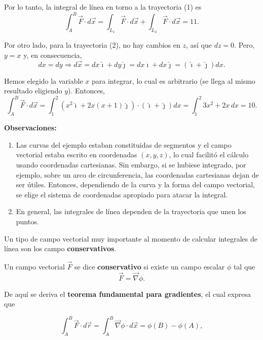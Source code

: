 \begin{ejemplo}
    Por lo tanto, la integral de línea en torno a la trayectoria (1) es
    $$\int_A^B \Vec{F} \cdot d\Vec{x} = \int_{L_1} \Vec{F} \cdot d \Vec{x} + \int_{L_2} \Vec{F} \cdot d \Vec{x} = 11.$$

    Por otro lado, para la trayectoria (2), no hay cambios en $z$, así que $dz = 0$. Pero, $y = x$ y, en consecuencia,
    $$dx = dy \Rightarrow d\Vec{x} = dx \hat{\imath} + dy \hat{\jmath} = dx \hat{\imath} + dx \hat{\jmath} = (\hat{\imath} + \hat{\jmath} ) dx.$$

    Hemos elegido la variable $x$ para integrar, lo cual es arbitrario (se llega al mismo resultado eligiendo $y$). Entonces,
    $$\int_A^B \Vec{F} \cdot d\Vec{x} = \int_1^2 (x^2 \hat{\imath} + 2x(x+1) \hat{\jmath}) \cdot (\hat{\imath} + \hat{\jmath} ) dx = \int_1^2 3x^2 + 2x \,dx = 10.$$
\end{ejemplo}

\textbf{Observaciones:}

\begin{enumerate}
    \item Las curvas del ejemplo estaban constituidas de segmentos y el campo vectorial estaba escrito en coordenadas $(x,y,z)$, lo cual facilitó el cálculo usando coordenadas cartesianas. Sin embargo, si se hubiese integrado, por ejemplo, sobre un arco de circunferencia, las coordenadas cartesianas dejan de ser útiles. Entonces, dependiendo de la curva y la forma del campo vectorial, se elige el sistema de coordenadas apropiado para atacar la integral.

    \item En general, las integrales de línea dependen de la trayectoria que unen los puntos.
\end{enumerate}


Un tipo de campo vectorial muy importante al momento de calcular integrales de línea son los campo \textbf{conservativos}. 

Un campo vectorial $\vec{F}$ se dice \textbf{conservativo} si existe un campo escalar $\phi$ tal que
\begin{equation*}
\vec{F} = \vec{\nabla} \phi.
\end{equation*}

De aquí se deriva el \textbf{teorema fundamental para gradientes}, el cual expresa que
\begin{shaded}
   \begin{equation*}
\int_A^B \vec{F} \cdot d\vec{r} = \int_A^B \Vec{\nabla} \phi \cdot d\Vec{x} = \phi(B) - \phi(A),
\end{equation*} 
\end{shaded}

